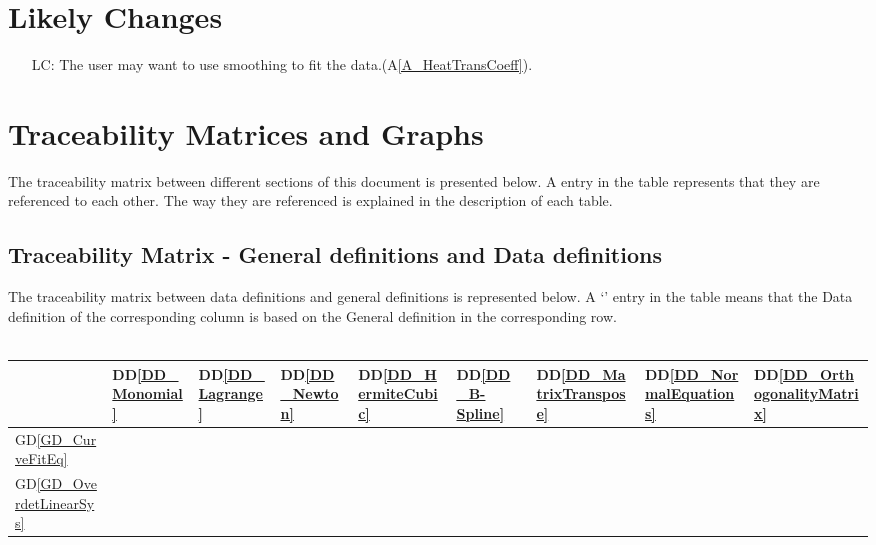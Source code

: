 \documentclass[12pt]{article}
\newcommand{\dref}[1]{GD\ref{#1}}
\newcommand{\ddref}[1]{DD\ref{#1}}
\newcommand{\aref}[1]{A\ref{#1}}
\newcounter{lcnum} %
\begin{document}
\section{Likely Changes}    

\noindent \begin{itemize}

\item[LC\refstepcounter{lcnum}\thelcnum\label{LC_Smoothing}:]The
user may want to use smoothing to fit the data.(\aref{A_HeatTransCoeff}). 

\end{itemize}

\section{Traceability Matrices and Graphs}
The traceability matrix between different sections of this document is presented below. A \checkmark entry in the table represents that they are referenced to each other. The way they are referenced is explained in the description of each table.
\subsection{Traceability Matrix - General definitions and Data definitions}
The traceability matrix between data definitions and general definitions is represented below. A `\checkmark' entry in the table means that the Data definition of the corresponding column is based on the General definition in the corresponding row.\\
~\newline
\begin{tabular}{|p{1.3cm}|p{1cm}|p{1cm}|p{1cm}|p{1cm}|p{1cm}|p{1cm}|p{1cm}|p{1cm}|}
	
	\hline
	 & \ddref{DD_Monomial} & \ddref{DD_Lagrange} & \ddref{DD_Newton} & \ddref{DD_HermiteCubic} & \ddref{DD_B-Spline} & \ddref{DD_MatrixTranspose}  & \ddref{DD_NormalEquations} & \ddref{DD_OrthogonalityMatrix}\\
	 \hline
	 \dref{GD_CurveFitEq} & \checkmark & \checkmark  & \checkmark  & \checkmark  & \checkmark  & \checkmark   & \checkmark & \checkmark\\
	  \hline
	 \dref{GD_OverdetLinearSys} &  &   &   &   &   & \checkmark   & \checkmark & \checkmark \\
	 
	\hline
	
\end{tabular}\\
\end{document}
